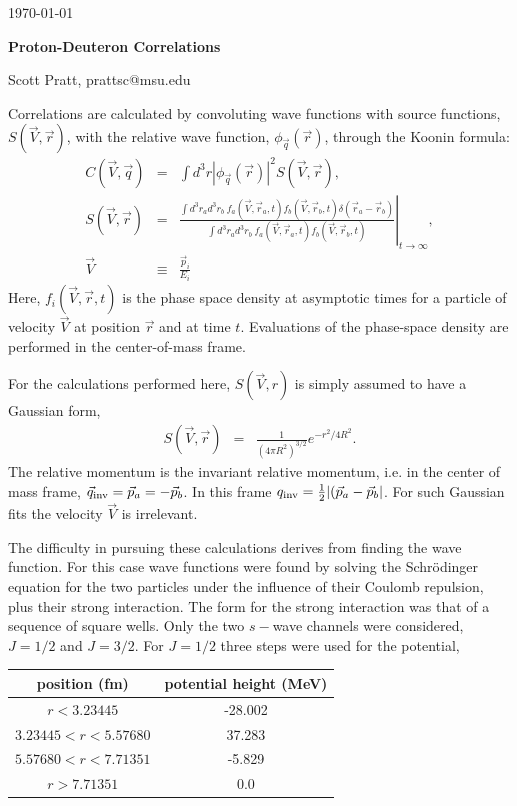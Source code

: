 \documentclass[12pt]{article}
\numberwithin{equation}{section}
\numberwithin{figure}{section}
\begin{document}
\today\\

\centerline{\bf\Large Proton-Deuteron Correlations}
\centerline{Scott Pratt, prattsc@msu.edu}

Correlations are calculated by convoluting wave functions with source functions, $S(\vec{V},\vec{r})$, with the relative wave function, $\phi_{\vec{q}}(\vec{r})$, through the Koonin formula:
\begin{eqnarray}
C(\vec{V},\vec{q})&=&\int d^3r |\phi_{\vec{q}}(\vec{r})|^2 S(\vec{V},\vec{r}),\\
\nonumber
S(\vec{V},\vec{r})&=&\left.\frac{\int d^3r_ad^3r_b~f_a(\vec{V},\vec{r}_a,t)f_b(\vec{V},\vec{r}_b,t)\delta(\vec{r}_a-\vec{r}_b)}
{\int d^3r_ad^3r_b~f_a(\vec{V},\vec{r}_a,t)f_b(\vec{V},\vec{r}_b,t)}\right|_{t\rightarrow\infty},\\
\nonumber
\vec{V}&\equiv&\frac{\vec{p}_i}{E_i}
\end{eqnarray}
Here, $f_i(\vec{V},\vec{r},t)$ is the phase space density at asymptotic times for a particle of velocity $\vec{V}$ at position $\vec{r}$ and at time $t$. Evaluations of the phase-space density are performed in the center-of-mass frame. 

For the calculations performed here, $S(\vec{V},r)$ is simply assumed to have a Gaussian form, 
\begin{eqnarray}
S(\vec{V},\vec{r})&=&\frac{1}{(4\pi R^2)^{3/2}}e^{-r^2/4R^2}.
\end{eqnarray}
The relative momentum is the invariant relative momentum, i.e. in the center of mass frame, $\vec{q}_{\rm inv}=\vec{p}_a=-\vec{p}_b$. In this frame $q_{\rm inv}=\frac{1}{2}|(\vec{p}_a-\vec{p}_b|$. For such Gaussian fits the velocity $\vec{V}$ is irrelevant. 

The difficulty in pursuing these calculations derives from finding the wave function. For this case wave functions were found by solving the Schr\"odinger equation for the two particles under the influence of their Coulomb repulsion, plus their strong interaction. The form for the strong interaction was that of a sequence of square wells. Only the two $s-$wave channels were considered, $J=1/2$ and $J=3/2$. For $J=1/2$ three steps were used for the potential,\\
\begin{tabular}{|c|c|}
\hline
position (fm) & potential height (MeV)\\
\hline
$r<3.23445$ & -28.002\\
$3.23445<r<5.57680$ & 37.283\\
$5.57680<r<7.71351$ & -5.829\\
$r>7.71351$ & 0.0\\
\hline
\end{tabular}\\
\end{document}
